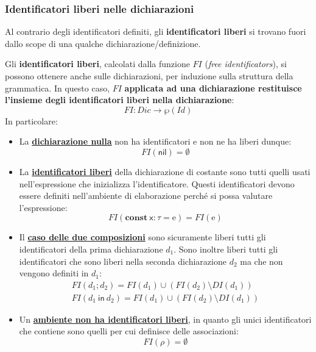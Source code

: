 \documentclass[a4paper]{article}
\begin{document}
	\subsubsection{Identificatori liberi nelle dichiarazioni}\label{identificatori liberi}
	
	Al contrario degli identificatori definiti, gli \textcolor{Red3}{\textbf{identificatori liberi}} si trovano fuori dallo scope di una qualche dichiarazione/definizione.\newline
	
	\noindent
	Gli \textbf{identificatori liberi}, calcolati dalla funzione $FI$ (\emph{free identificators}), si possono ottenere anche sulle dichiarazioni, per induzione sulla struttura della grammatica. In questo caso, $FI$ \textbf{applicata ad una dichiarazione restituisce l'insieme degli identificatori liberi nella dichiarazione}:
	\begin{equation*}
		FI: Dic \longrightarrow \wp\left(Id\right)
	\end{equation*}
	In particolare:
	\begin{itemize}
		\item La \textbf{\underline{dichiarazione nulla}} non ha identificatori e non ne ha liberi dunque:
		\begin{equation*}
			FI\left(\mathsf{nil}\right) = \emptyset
		\end{equation*}
		
		\item La \textbf{\underline{identificatori liberi}} della dichiarazione di costante sono tutti quelli usati nell'espressione che inizializza l'identificatore. Questi identificatori devono essere definiti nell'ambiente di elaborazione perché si possa valutare l'espressione:
		\begin{equation*}
			FI\left(\mathbf{const} \: \mathsf{x}: \tau = \mathrm{e}\right) = FI\left(\mathrm{e}\right)
		\end{equation*}
		
		\item Il \textbf{\underline{caso delle due composizioni}} sono sicuramente liberi tutti gli identificatori della prima dichiarazione $d_{1}$. Sono inoltre liberi tutti gli identificatori che sono liberi nella seconda dichiarazione $d_{2}$ ma che non vengono definiti in $d_{1}$:
		\begin{gather*}
			FI\left(d_{1} ; d_{2}\right) = FI\left(d_{1}\right) \cup \left(FI\left(d_{2}\right) \setminus DI\left(d_{1}\right)\right) \\
			FI\left(d_{1} \: \mathsf{in} \: d_{2}\right) = FI\left(d_{1}\right) \cup \left(FI\left(d_{2}\right) \setminus DI\left(d_{1}\right)\right)
		\end{gather*}
		
		\item Un \textbf{\underline{ambiente non ha identificatori liberi}}, in quanto gli unici identificatori che contiene sono quelli per cui definisce delle associazioni:
		\begin{equation*}
			FI\left(\rho\right) = \emptyset
		\end{equation*}
	\end{itemize}\newpage
	
\end{document}

